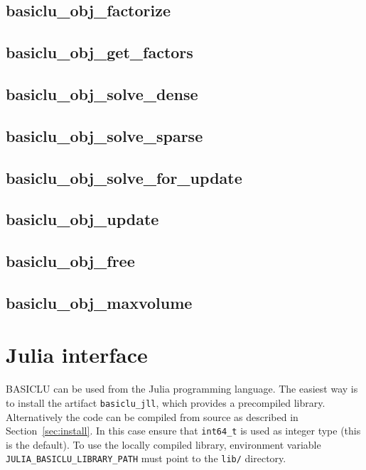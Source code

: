 \documentclass{article}
\newcommand{\ct}{\texttt}
\begin{document}
\newpage
\subsection{basiclu\_obj\_factorize}
{\footnotesize

}

\newpage
\subsection{basiclu\_obj\_get\_factors}
{\footnotesize

}

\newpage
\subsection{basiclu\_obj\_solve\_dense}
{\footnotesize

}

\newpage
\subsection{basiclu\_obj\_solve\_sparse}
{\footnotesize

}

\newpage
\subsection{basiclu\_obj\_solve\_for\_update}
{\footnotesize

}

\newpage
\subsection{basiclu\_obj\_update}
{\footnotesize

}

\newpage
\subsection{basiclu\_obj\_free}
{\footnotesize

}

\newpage
\subsection{basiclu\_obj\_maxvolume}
{\footnotesize

}
\newpage
 
\section{Julia interface}
BASICLU can be used from the Julia programming language. The easiest way is to
install the artifact \ct{basiclu\_jll}, which provides a precompiled library.
Alternatively the code can be compiled from source as described in
Section~\ref{sec:install}. In this case ensure that \ct{int64\_t} is used as
integer type (this is the default). To use the locally compiled library,
environment variable \ct{JULIA\_BASICLU\_LIBRARY\_PATH} must point to the
\ct{lib/} directory.
\end{document}
